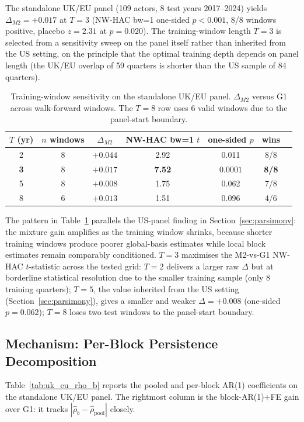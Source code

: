 \documentclass[11pt,a4paper]{article}
\begin{document}
The standalone UK/EU panel (109 actors, 8 test years 2017--2024) yields $\Delta_{M2} = +0.017$ at $T=3$ (NW-HAC bw=1 one-sided $p < 0.001$, 8/8 windows positive, placebo $z = 2.31$ at $p = 0.020$). The training-window length $T=3$ is selected from a sensitivity sweep on the panel itself rather than inherited from the US setting, on the principle that the optimal training depth depends on panel length (the UK/EU overlap of 59 quarters is shorter than the US sample of 84 quarters).

\begin{table}[H]
\centering
\caption{Training-window sensitivity on the standalone UK/EU panel. $\Delta_{M2}$ versus G1 across walk-forward windows. The $T=8$ row uses 6 valid windows due to the panel-start boundary.}
\label{tab:uk_eu_t_sweep}
\small
\begin{tabular}{ccccccc}
\toprule
$T$ (yr) & $n$ windows & $\Delta_{M2}$ & NW-HAC bw=1 $t$ & one-sided $p$ & wins \\
\midrule
2 & 8 & $+0.044$ & 2.92 & 0.011 & 8/8 \\
\textbf{3} & 8 & $\mathbf{+0.017}$ & \textbf{7.52} & $\mathbf{0.0001}$ & \textbf{8/8} \\
5 & 8 & $+0.008$ & 1.75 & 0.062 & 7/8 \\
8 & 6 & $+0.013$ & 1.51 & 0.096 & 4/6 \\
\bottomrule
\end{tabular}
\end{table}

The pattern in Table~\ref{tab:uk_eu_t_sweep} parallels the US-panel finding in Section~\ref{sec:parsimony}: the mixture gain amplifies as the training window shrinks, because shorter training windows produce poorer global-basis estimates while local block estimates remain comparably conditioned. $T=3$ maximises the M2-vs-G1 NW-HAC $t$-statistic across the tested grid: $T=2$ delivers a larger raw $\Delta$ but at borderline statistical resolution due to the smaller training sample (only 8 training quarters); $T=5$, the value inherited from the US setting (Section~\ref{sec:parsimony}), gives a smaller and weaker $\Delta = +0.008$ (one-sided $p = 0.062$); $T=8$ loses two test windows to the panel-start boundary.

\subsection{Mechanism: Per-Block Persistence Decomposition}

Table~\ref{tab:uk_eu_rho_b} reports the pooled and per-block AR(1) coefficients on the standalone UK/EU panel. The rightmost column is the block-AR(1)+FE gain over G1: it tracks $|\hat\rho_b - \hat\rho_{\text{pool}}|$ closely.
\end{document}
